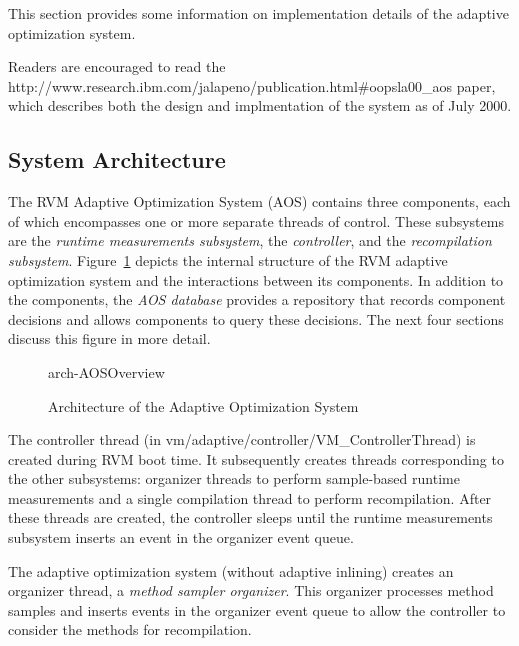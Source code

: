 This section provides some information on 
implementation details of the adaptive optimization system.

Readers are encouraged to read the 
{http://www.research.ibm.com/jalapeno/publication.html\#oopsla00\_aos}  
paper, which describes both the design and implmentation of the system
as of July 2000.


\subsection{System Architecture}
The RVM Adaptive Optimization System (AOS) contains three components, 
each of which encompasses one or more separate threads of control. 
These subsystems are 
the {\em runtime measurements subsystem\/}, 
the {\em controller\/},  
and the {\em recompilation subsystem\/}.  
Figure~\ref{fig:arch-AOSOverview} depicts the internal structure of
the RVM adaptive optimization system and the interactions between its
components. 
In addition to the components, the {\em AOS database} provides a 
repository that records component decisions and allows components 
to query these decisions.
The next four sections discuss this figure in more detail.

\begin{figure}
\begin{center}
\begin{gif}{arch-AOSOverview}
\vbox{
\hbox{
}
}\hfil
\end{gif}
\end{center}
\caption{Architecture of the Adaptive Optimization System}
\label{fig:arch-AOSOverview}
\end{figure}

The controller thread (in vm/adaptive/controller/VM\_ControllerThread)
is created during RVM boot time.  It subsequently creates threads
corresponding to the other subsystems: organizer threads to perform
sample-based runtime measurements and a single compilation thread to
perform recompilation. After these threads are created, the controller
sleeps until the runtime measurements subsystem inserts an event in
the organizer event queue.

The adaptive optimization system (without adaptive inlining) creates
an organizer thread, a {\em method sampler organizer\/}.  This
organizer processes method samples and inserts events in the organizer
event queue to allow the controller to consider the methods for
recompilation.

